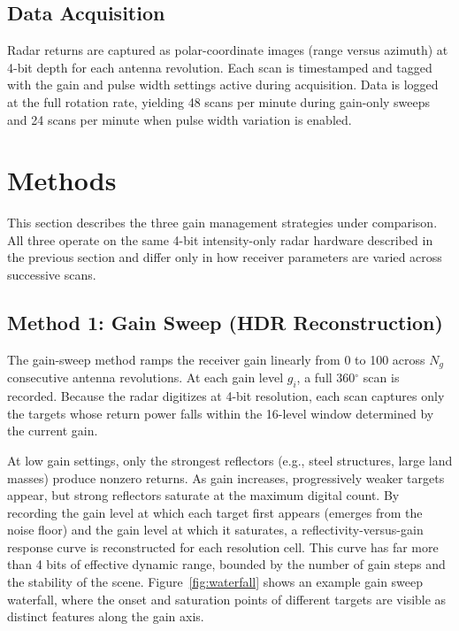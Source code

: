\documentclass[colorlinks,upint,balance]{asmeconf}
\begin{document}

\subsection{Data Acquisition}
Radar returns are captured as polar-coordinate images (range versus azimuth) at 4-bit depth for each antenna revolution. Each scan is timestamped and tagged with the gain and pulse width settings active during acquisition. Data is logged at the full rotation rate, yielding 48 scans per minute during gain-only sweeps and 24 scans per minute when pulse width variation is enabled.


\section{Methods}

This section describes the three gain management strategies under comparison. All three operate on the same 4-bit intensity-only radar hardware described in the previous section and differ only in how receiver parameters are varied across successive scans.

\subsection{Method 1: Gain Sweep (HDR Reconstruction)}
The gain-sweep method ramps the receiver gain linearly from 0 to 100 across $N_g$ consecutive antenna revolutions. At each gain level $g_i$, a full 360$^\circ$ scan is recorded. Because the radar digitizes at 4-bit resolution, each scan captures only the targets whose return power falls within the 16-level window determined by the current gain.

At low gain settings, only the strongest reflectors (e.g., steel structures, large land masses) produce nonzero returns. As gain increases, progressively weaker targets appear, but strong reflectors saturate at the maximum digital count. By recording the gain level at which each target first appears (emerges from the noise floor) and the gain level at which it saturates, a reflectivity-versus-gain response curve is reconstructed for each resolution cell. This curve has far more than 4 bits of effective dynamic range, bounded by the number of gain steps and the stability of the scene. Figure~\ref{fig:waterfall} shows an example gain sweep waterfall, where the onset and saturation points of different targets are visible as distinct features along the gain axis.
\end{document}

